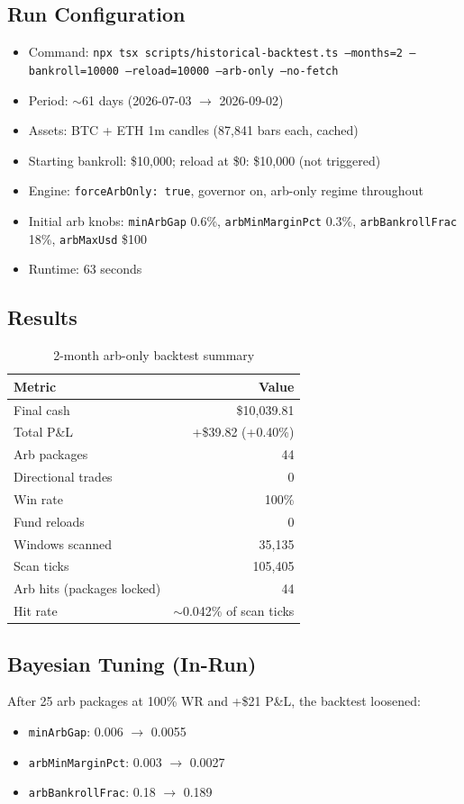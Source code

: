 \documentclass[11pt,a4paper]{article}
\begin{document}
\subsection{Run Configuration}
\begin{itemize}[noitemsep]
  \item Command: \texttt{npx tsx scripts/historical-backtest.ts --months=2 --bankroll=10000 --reload=10000 --arb-only --no-fetch}
  \item Period: $\sim$61 days (2026-07-03 $\rightarrow$ 2026-09-02)
  \item Assets: BTC + ETH 1m candles (87{,}841 bars each, cached)
  \item Starting bankroll: \$10{,}000; reload at \$0: \$10{,}000 (not triggered)
  \item Engine: \texttt{forceArbOnly: true}, governor on, arb-only regime throughout
  \item Initial arb knobs: \texttt{minArbGap} 0.6\%, \texttt{arbMinMarginPct} 0.3\%, \texttt{arbBankrollFrac} 18\%, \texttt{arbMaxUsd} \$100
  \item Runtime: 63 seconds
\end{itemize}

\subsection{Results}
\begin{table}[h]
\centering
\begin{tabular}{@{}lr@{}}
\toprule
\textbf{Metric} & \textbf{Value} \\
\midrule
Final cash & \$10{,}039.81 \\
Total P\&L & +\$39.82 (+0.40\%) \\
Arb packages & 44 \\
Directional trades & 0 \\
Win rate & 100\% \\
Fund reloads & 0 \\
Windows scanned & 35{,}135 \\
Scan ticks & 105{,}405 \\
Arb hits (packages locked) & 44 \\
Hit rate & $\sim$0.042\% of scan ticks \\
\bottomrule
\end{tabular}
\caption{2-month arb-only backtest summary}
\end{table}

\subsection{Bayesian Tuning (In-Run)}
After 25 arb packages at 100\% WR and +\$21 P\&L, the backtest loosened:
\begin{itemize}[noitemsep]
  \item \texttt{minArbGap}: 0.006 $\rightarrow$ 0.0055
  \item \texttt{arbMinMarginPct}: 0.003 $\rightarrow$ 0.0027
  \item \texttt{arbBankrollFrac}: 0.18 $\rightarrow$ 0.189
\end{itemize}
\end{document}
